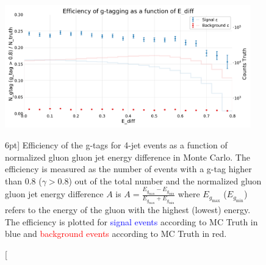 \documentclass[a4paper, twoside, nobib]{tufte-book}
\begin{document}
\begin{figure}
  \includegraphics[width=0.95\textwidth, trim=0 0 0 40, clip, page=1]{figures/quarks/efficiency_events-down_sample=1.00-ML_vars=vertex-selection=b-ejet_min=4-n_iter_RS_lgb=99-n_iter_RS_xgb=9-cdot_cut=0.90-version=19-njet=4.pdf}
  \caption[g-Tagging efficiency for 4-jet events in MC as a function of normalized gluon gluon jet energy difference][6pt]
          {Efficiency of the g-tags for 4-jet events as a function of normalized gluon gluon jet energy difference in Monte Carlo. The efficiency is measured as the number of events with a g-tag higher than 0.8 ($\gamma > 0.8$) out of the total number and the normalized gluon gluon jet energy difference $A$ is $A=\frac{E_{g_\mathrm{max}}-E_{g_\mathrm{min}}}{E_{g_\mathrm{max}}+E_{g_\mathrm{min}}}$ where $E_{g_\mathrm{max}}$ ($E_{g_\mathrm{min}}$) refers to the energy of the gluon with the highest (lowest) energy. The efficiency is plotted for \textcolor{blue}{signal events} according to MC Truth in blue and \textcolor{red}{background events} according to MC Truth in red.
          } 
  \label{fig:q:effiency_gtag_E_diff}
\end{figure}
\end{document}
